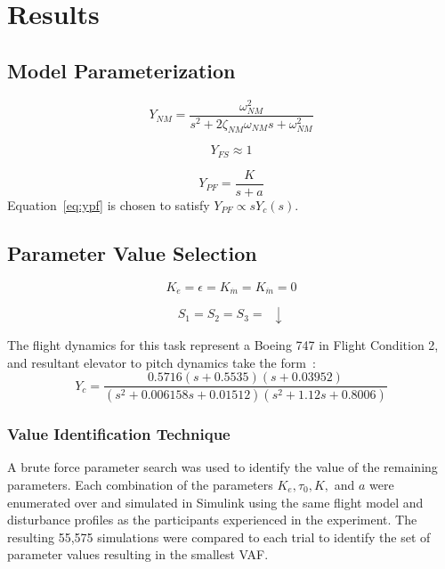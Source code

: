 \section{Results}


\subsection{Model Parameterization}
\begin{equation}
    Y_{NM} = \frac{\omega^2_{NM}}{s^2 + 2 \zeta_{NM} \omega_{NM} s + \omega^2_{NM}}
\end{equation}

\begin{equation}
    Y_{FS} \approx 1
\end{equation}

\begin{equation} \label{eq:ypf}
    Y_{PF} = \frac{K}{s+a}
\end{equation}
Equation~\ref{eq:ypf} is chosen to satisfy $Y_{PF} \propto s Y_c (s)$.

\subsection{Parameter Value Selection}

\begin{equation}
    K_{\dot{e}} = \epsilon = K_{\dot{m}} = K_{\ddot{m}} = 0
\end{equation}

\begin{equation}
    S_1 = S_2 = S_3 = \enspace \downarrow
\end{equation}


The flight dynamics for this task represent a Boeing 747 in Flight Condition 2, and resultant elevator to pitch dynamics take the form~\citep{heffley1972aircraft}:
\begin{equation}
Y_c = \frac{0.5716 (s+0.5535) (s+0.03952)}{(s^2 + 0.006158s + 0.01512) (s^2 + 1.12s + 0.8006)}
\end{equation}

\subsubsection{Value Identification Technique}
A brute force parameter search was used to identify the value of the remaining parameters.
Each combination of the parameters $K_e, \tau_0, K,$ and $a$ were enumerated over and simulated in Simulink using the same flight model and disturbance profiles as the participants experienced in the experiment.
The resulting 55,575 simulations were compared to each trial to identify the set of parameter values resulting in the smallest VAF.

